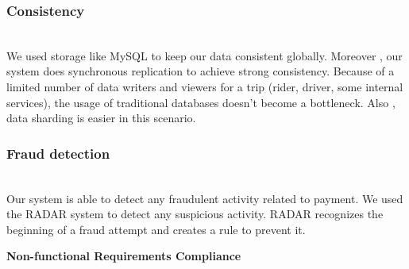 \subsubsection{Consistency}\label{3f-4ppMhQU6UF01s-7bic}
\\
We used storage like MySQL to keep our data consistent globally. Moreover , our system does synchronous replication to achieve strong consistency. Because of a limited number of data writers and viewers for a trip (rider, driver, some internal services), the usage of traditional databases doesn't become a bottleneck. Also
, data sharding is easier in this scenario.

\subsubsection{Fraud detection}\label{b50A9gTAz46CybyS-KJZ-}
\\
Our system is able to detect any fraudulent activity related to payment. We used the RADAR system to detect any suspicious activity. RADAR recognizes the beginning of a fraud attempt and creates a rule to prevent it.

\textbf{Non-functional Requirements Compliance}

